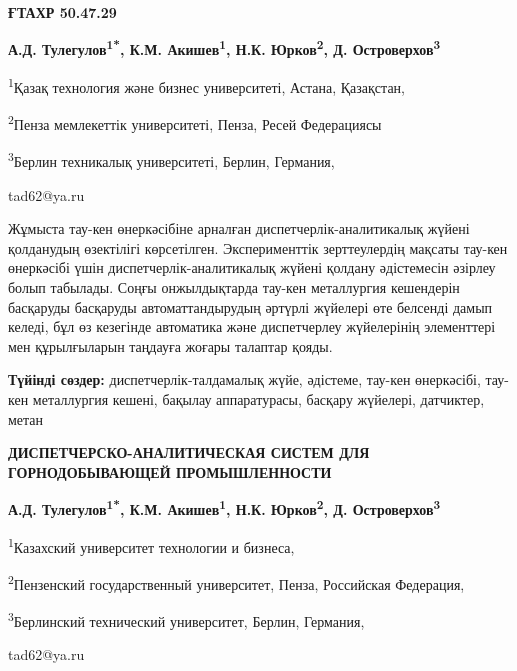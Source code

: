 \clearpage
{\bfseries ҒТАХР 50.47.29}


\begin{center}
{\bfseries А.Д. Тулегулов\textsuperscript{1*}, К.М.
Акишев\textsuperscript{1}, Н.К. Юрков\textsuperscript{2}, Д.
Островерхов\textsuperscript{3}}

\textsuperscript{1}Қазақ технология және бизнес университеті, Астана,
Қазақстан,

\textsuperscript{2}Пенза мемлекеттік университеті, Пенза, Ресей
Федерациясы

\textsuperscript{3}Берлин техникалық университеті, Берлин, Германия,

tad62@ya.ru
\end{center}

\hspace{1.5em} Жұмыста тау-кен өнеркәсібіне арналған диспетчерлік-аналитикалық жүйені
қолданудың өзектілігі көрсетілген. Эксперименттік зерттеулердің мақсаты
тау-кен өнеркәсібі үшін диспетчерлік-аналитикалық жүйені қолдану
әдістемесін әзірлеу болып табылады. Соңғы онжылдықтарда тау-кен
металлургия кешендерін басқаруды басқаруды автоматтандырудың әртүрлі
жүйелері өте белсенді дамып келеді, бұл өз кезегінде автоматика және
диспетчерлеу жүйелерінің элементтері мен құрылғыларын таңдауға жоғары
талаптар қояды.

\hspace{1.5em} {\bfseries Түйінді сөздер:} диспетчерлік-талдамалық жүйе, әдістеме, тау-кен
өнеркәсібі, тау-кен металлургия кешені, бақылау аппаратурасы, басқару
жүйелері, датчиктер, метан

\begin{center}
{\large\bfseries ДИСПЕТЧЕРСКО-АНАЛИТИЧЕСКАЯ СИСТЕМ ДЛЯ ГОРНОДОБЫВАЮЩЕЙ ПРОМЫШЛЕННОСТИ}

\vspace{1em}

{\bfseries А.Д. Тулегулов\textsuperscript{1*}, К.М.
Акишев\textsuperscript{1}, Н.К. Юрков\textsuperscript{2}, Д.
Островерхов\textsuperscript{3}}

\textsuperscript{1}Казахский университет технологии и бизнеса,

\textsuperscript{2}Пензенский государственный университет, Пенза,
Российская Федерация,

\textsuperscript{3}Берлинский технический университет, Берлин, Германия,

tad62@ya.ru
\end{center}

